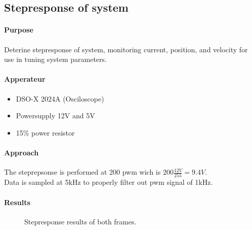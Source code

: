 \documentclass[../../main]{subfiles}
\begin{document}
\subsection{Stepresponse of system}%
\label{sub:stepresponse_of_system}

\paragraph{Purpose}%
\label{par:purpose}

Deterine stepresponse of system, monitoring current, position, and velocity for use in tuning system parameters.

\paragraph{Apperateur}%
\label{par:apperateur}
\begin{itemize}
	\item DSO-X 2024A (Osciloscope)
	\item Powersupply 12\si{V} and 5\si{V}
	\item 1\si{\Omega}5\% power resistor
\end{itemize}


\paragraph{Approach}%
\label{par:approach}
The steprepsonse is performed at 200 pwm wich is $200\frac{12\si{V}}{255} = 9.4\si{V}$.\\
Data is sampled at 5\si{kHz} to properly filter out pwm signal of 1\si{kHz}.

\paragraph{Results}%
\label{par:results}

\begin{figure}[H]
        \centering
				\def\svgwidth{0.47\columnwidth}
				\def\svgwidth{0.47\columnwidth}
				\caption{Stepresponse results of both frames.}
				\label{fig:jour_step_bot}
\end{figure}
\end{document}
